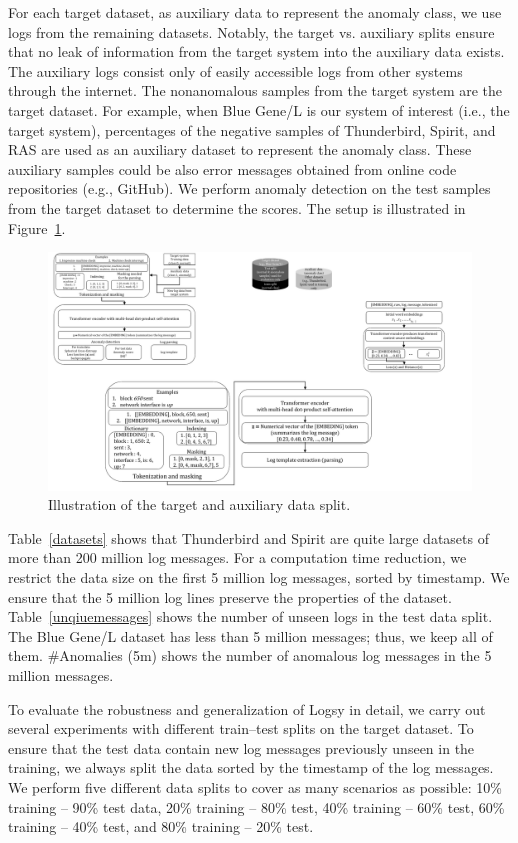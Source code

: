 For each target dataset, as auxiliary data to represent the anomaly class, we use logs from the remaining datasets. Notably, the target vs. auxiliary splits ensure that no leak of information from the target system into the auxiliary data exists. The auxiliary logs consist only of easily accessible logs from other systems through the internet. 
The nonanomalous samples from the target system are the target dataset. For example, when Blue Gene/L is our system of interest (i.e., the target system), percentages of the negative samples of Thunderbird, Spirit, and RAS are used as an auxiliary dataset to represent the anomaly class. These auxiliary samples could be also error messages obtained from online code repositories (e.g., GitHub).
We perform anomaly detection on the test samples from the target dataset to determine the scores. The setup is illustrated in Figure~\ref{fig:datasplits}.


\begin{figure}[!htbp]
    \centering
    \includegraphics[width=0.7\columnwidth]{gfx/chap5/datasplits.pdf}
    \caption{Illustration of the target and auxiliary data split.}
    \label{fig:datasplits}
\end{figure}

Table~\ref{datasets} shows that Thunderbird and Spirit are quite large datasets of more than 200 million log messages. For a computation time reduction, we restrict the data size on the first 5 million log messages, sorted by timestamp. We ensure that the 5 million log lines preserve the properties of the dataset. Table~\ref{unqiuemessages} shows the number of unseen logs in the test data split. The Blue Gene/L dataset has less than 5 million messages; thus, we keep all of them. \#Anomalies (5m) shows the number of anomalous log messages in the 5 million messages. 



To evaluate the robustness and generalization of Logsy in detail, we carry out several experiments with different train--test splits on the target dataset. To ensure that the test data contain new log messages previously unseen in the training, we always split the data sorted by the timestamp of the log messages. We perform five different data splits to cover as many scenarios as possible: 10\% training -- 90\% test data, 20\% training -- 80\% test, 40\% training -- 60\% test, 60\% training -- 40\% test, and 80\% training -- 20\% test.

